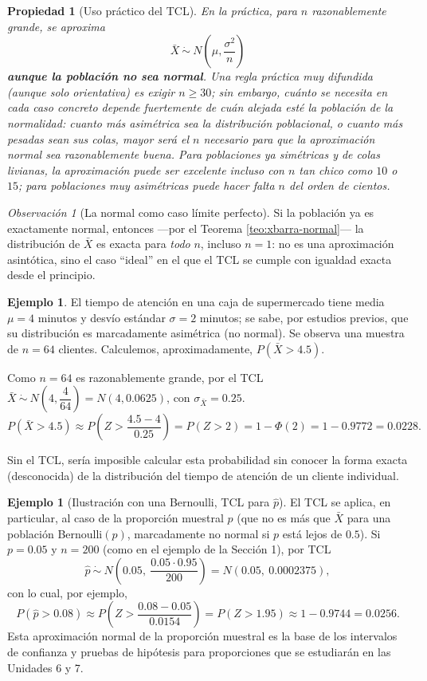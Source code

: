 \documentclass[11pt,a4paper]{article}
\theoremstyle{plain}
\newtheorem{propiedad}[teorema]{Propiedad}
\theoremstyle{definition}
\newtheorem{ejemplo}[teorema]{Ejemplo}
\theoremstyle{remark}
\newtheorem{observacion}[teorema]{Observación}
\begin{document}
\begin{propiedad}[Uso práctico del TCL]
En la práctica, para $n$ razonablemente grande, se aproxima
$$\bar X \ \dot\sim\ N\!\left(\mu,\frac{\sigma^2}{n}\right)$$
\textbf{aunque la población no sea normal}. Una regla práctica muy difundida (aunque solo orientativa) es exigir $n\geq 30$; sin embargo, cuánto se necesita en cada caso concreto depende fuertemente de cuán alejada esté la población de la normalidad: cuanto más asimétrica sea la distribución poblacional, o cuanto más pesadas sean sus colas, mayor será el $n$ necesario para que la aproximación normal sea razonablemente buena. Para poblaciones ya simétricas y de colas livianas, la aproximación puede ser excelente incluso con $n$ tan chico como $10$ o $15$; para poblaciones muy asimétricas puede hacer falta $n$ del orden de cientos.
\end{propiedad}

\begin{observacion}[La normal como caso límite perfecto]
Si la población ya es exactamente normal, entonces —por el Teorema \ref{teo:xbarra-normal}— la distribución de $\bar X$ es exacta para \emph{todo} $n$, incluso $n=1$: no es una aproximación asintótica, sino el caso ``ideal'' en el que el TCL se cumple con igualdad exacta desde el principio.
\end{observacion}

\begin{ejemplo}
El tiempo de atención en una caja de supermercado tiene media $\mu=4$ minutos y desvío estándar $\sigma=2$ minutos; se sabe, por estudios previos, que su distribución es marcadamente asimétrica (no normal). Se observa una muestra de $n=64$ clientes. Calculemos, aproximadamente, $P(\bar X>4.5)$.

Como $n=64$ es razonablemente grande, por el TCL $\bar X\ \dot\sim\ N\left(4,\dfrac{4}{64}\right)=N(4,0.0625)$, con $\sigma_{\bar X}=0.25$.
$$P(\bar X>4.5) \approx P\left(Z>\frac{4.5-4}{0.25}\right) = P(Z>2) = 1-\Phi(2)=1-0.9772=0.0228.$$

Sin el TCL, sería imposible calcular esta probabilidad sin conocer la forma exacta (desconocida) de la distribución del tiempo de atención de un cliente individual.
\end{ejemplo}

\begin{ejemplo}[Ilustración con una Bernoulli, TCL para $\hat p$]
El TCL se aplica, en particular, al caso de la proporción muestral $\hat p$ (que no es más que $\bar X$ para una población Bernoulli$(p)$, marcadamente no normal si $p$ está lejos de $0.5$). Si $p=0.05$ y $n=200$ (como en el ejemplo de la Sección 1), por TCL
$$\hat p\ \dot\sim\ N\!\left(0.05,\ \frac{0.05\cdot 0.95}{200}\right) = N(0.05,\ 0.0002375),$$
con lo cual, por ejemplo,
$$P(\hat p > 0.08) \approx P\left(Z > \frac{0.08-0.05}{0.0154}\right) = P(Z>1.95) \approx 1-0.9744 = 0.0256.$$
Esta aproximación normal de la proporción muestral es la base de los intervalos de confianza y pruebas de hipótesis para proporciones que se estudiarán en las Unidades 6 y 7.
\end{ejemplo}
\end{document}
